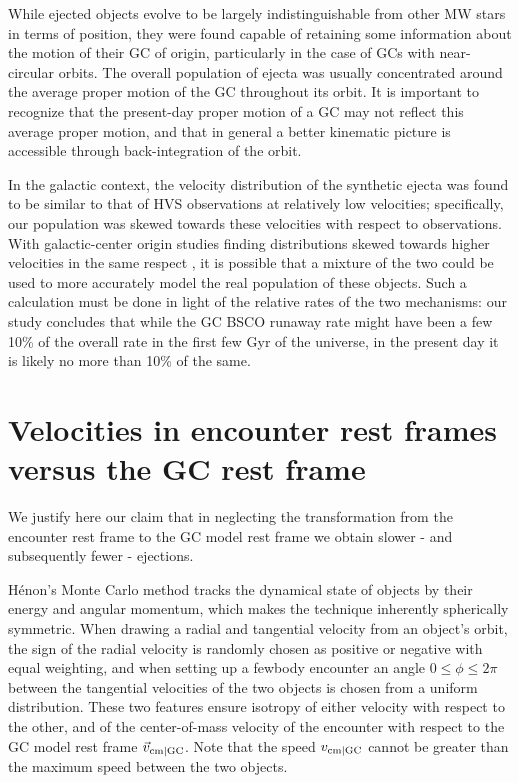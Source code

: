 \documentclass[twocolumn]{aastex631}
\begin{document}
While ejected objects evolve to be largely indistinguishable from other MW stars in terms of position, they were found capable of retaining some information about the motion of their GC of origin, particularly in the case of GCs with near-circular orbits.
The overall population of ejecta was usually concentrated around the average proper motion of the GC throughout its orbit.
It is important to recognize that the present-day proper motion of a GC may not reflect this average proper motion, and that in general a better kinematic picture is accessible through back-integration of the orbit.

In the galactic context, the velocity distribution of the synthetic ejecta was found to be similar to that of HVS observations at relatively low velocities; specifically, our population was skewed towards these velocities with respect to observations.
With galactic-center origin studies finding distributions skewed towards higher velocities in the same respect \citet{2018ApJ...866...39B}, it is possible that a mixture of the two could be used to more accurately model the real population of these objects.
Such a calculation must be done in light of the relative rates of the two mechanisms: our study concludes that while the GC BSCO runaway rate might have been a few 10\% of the overall rate in the first few Gyr of the universe, in the present day it is likely no more than 10\% of the same.

\appendix

\section{Velocities in encounter rest frames versus the GC rest frame} \label{app:restframe}

We justify here our claim that in neglecting the transformation from the encounter rest frame to the GC model rest frame we obtain slower - and subsequently fewer - ejections.

H\'enon's Monte Carlo method tracks the dynamical state of objects by their energy and angular momentum, which makes the technique inherently spherically symmetric.
When drawing a radial and tangential velocity from an object's orbit, the sign of the radial velocity is randomly chosen as positive or negative with equal weighting, and when setting up a fewbody encounter an angle $0 \le \phi \le 2\pi$ between the tangential velocities of the two objects is chosen from a uniform distribution.
These two features ensure isotropy of either velocity with respect to the other, and of the center-of-mass velocity of the encounter with respect to the GC model rest frame $\vec{v}_{\rm cm|GC}$.
Note that the speed $v_{\rm cm|GC}$ cannot be greater than the maximum speed between the two objects.
\end{document}
